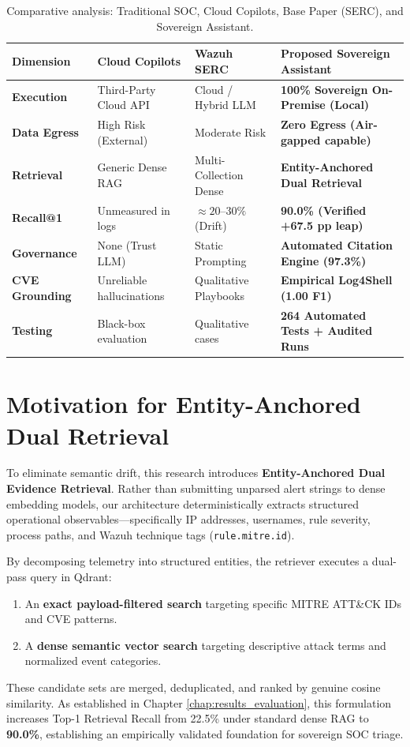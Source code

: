 \begin{table}[!htbp]
\centering
\caption{Comparative analysis: Traditional SOC, Cloud Copilots, Base Paper (SERC), and Sovereign Assistant.}
\label{tab:lit_comparison}
\small
\begin{tabularx}{\textwidth}{@{}l p{3.2cm} p{3.2cm} X@{}}
\toprule
\textbf{Dimension} & \textbf{Cloud Copilots} & \textbf{Wazuh SERC \cite{sensors2025wazuhcopilot}} & \textbf{Proposed Sovereign Assistant} \\
\midrule
\textbf{Execution} & Third-Party Cloud API & Cloud / Hybrid LLM & \textbf{100\% Sovereign On-Premise (Local)} \\
\textbf{Data Egress} & High Risk (External) & Moderate Risk & \textbf{Zero Egress (Air-gapped capable)} \\
\textbf{Retrieval} & Generic Dense RAG & Multi-Collection Dense & \textbf{Entity-Anchored Dual Retrieval} \\
\textbf{Recall@1} & Unmeasured in logs & $\approx 20\text{--}30\%$ (Drift) & \textbf{90.0\% (Verified +67.5 pp leap)} \\
\textbf{Governance} & None (Trust LLM) & Static Prompting & \textbf{Automated Citation Engine (97.3\%)} \\
\textbf{CVE Grounding} & Unreliable hallucinations & Qualitative Playbooks & \textbf{Empirical Log4Shell (1.00 F1)} \\
\textbf{Testing} & Black-box evaluation & Qualitative cases & \textbf{264 Automated Tests + Audited Runs} \\
\bottomrule
\end{tabularx}
\end{table}

\section{Motivation for Entity-Anchored Dual Retrieval}
\label{sec:lit_motivation_anchoring}
To eliminate semantic drift, this research introduces \textbf{Entity-Anchored Dual Evidence Retrieval}. Rather than submitting unparsed alert strings to dense embedding models, our architecture deterministically extracts structured operational observables—specifically IP addresses, usernames, rule severity, process paths, and Wazuh technique tags (\texttt{rule.mitre.id}).

By decomposing telemetry into structured entities, the retriever executes a dual-pass query in Qdrant:
\begin{enumerate}
  \item An \textbf{exact payload-filtered search} targeting specific MITRE ATT\&CK IDs and CVE patterns.
  \item A \textbf{dense semantic vector search} targeting descriptive attack terms and normalized event categories.
\end{enumerate}
These candidate sets are merged, deduplicated, and ranked by genuine cosine similarity. As established in Chapter \ref{chap:results_evaluation}, this formulation increases Top-1 Retrieval Recall from 22.5\% under standard dense RAG to \textbf{90.0\%}, establishing an empirically validated foundation for sovereign SOC triage.